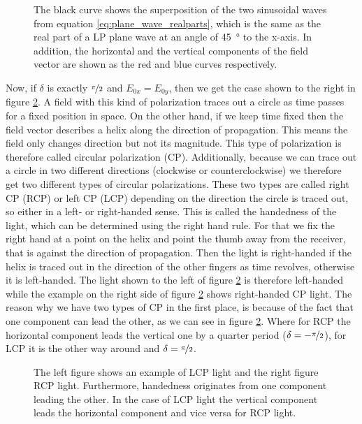 \begin{figure}[h]
    \centering
    
    \caption{The black curve shows the superposition of the two sinusoidal waves from equation \ref{eq:plane_wave_realparts}, which is the same as the real part of a LP plane wave at an angle of \SI{45}{\degree} to the x-axis. In addition, the horizontal and the vertical components of the field vector are shown as the red and blue curves respectively.}
    \label{fig:E_planewave}
\end{figure}

Now, if $\delta$ is exactly $\nicefrac{\pi}{2}$ and $E_{0x} = E_{0y}$, then we get the case shown to the right in figure \ref{fig:circ_pol_planewave}. A field with this kind of polarization traces out a circle as time passes for a fixed position in space. On the other hand, if we keep time fixed then the field vector describes a helix along the direction of propagation. This means the field only changes direction but not its magnitude. This type of polarization is therefore called circular polarization (CP). Additionally, because we can trace out a circle in two different directions (clockwise or counterclockwise) we therefore get two different types of circular polarizations. These two types are called right CP (RCP) or left CP (LCP) depending on the direction the circle is traced out, so either in a left- or right-handed sense. This is called the handedness of the light, which can be determined using the right hand rule. For that we fix the right hand at a point on the helix and point the thumb away from the receiver, that is against the direction of propagation. Then the light is right-handed if the helix is traced out in the direction of the other fingers as time revolves, otherwise it is left-handed. The light shown to the left of figure \ref{fig:circ_pol_planewave} is therefore left-handed while the example on the right side of figure \ref{fig:circ_pol_planewave} shows right-handed CP light. The reason why we have two types of CP in the first place, is because of the fact that one component can lead the other, as we can see in figure \ref{fig:circ_pol_planewave}. Where for RCP the horizontal component leads the vertical one by a quarter period ($\delta = -\nicefrac{\pi}{2}$), for LCP it is the other way around and $\delta = \nicefrac{\pi}{2}$. 

\begin{figure}[h]
\centering
    \begin{subfigure}
        \centering
        
    \end{subfigure}
    \begin{subfigure}
        \centering
        
    \end{subfigure}
    \caption{The left figure shows an example of LCP light and the right figure RCP light. Furthermore, handedness originates from one component leading the other. In the case of LCP light the vertical component leads the horizontal component and vice versa for RCP light.}
    \label{fig:circ_pol_planewave}
\end{figure}

